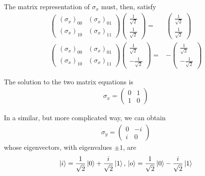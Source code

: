 The matrix representation of $\sigma_x$ must, then, satisfy
\begin{align*}
    \begin{pmatrix}
        (\sigma_x)_{00} & (\sigma_x)_{01}\\ (\sigma_x)_{10} & (\sigma_x)_{11}
    \end{pmatrix}\begin{pmatrix}
        \frac{1}{\sqrt{2}} \\ \frac{1}{\sqrt{2}}
    \end{pmatrix}=&\begin{pmatrix}
        \frac{1}{\sqrt{2}} \\ \frac{1}{\sqrt{2}}
    \end{pmatrix} \\
    \begin{pmatrix}
        (\sigma_x)_{00} & (\sigma_x)_{01}\\ (\sigma_x)_{10} & (\sigma_x)_{11}
    \end{pmatrix}\begin{pmatrix}
        \frac{1}{\sqrt{2}} \\ -\frac{1}{\sqrt{2}}
    \end{pmatrix}=&-\begin{pmatrix}
        \frac{1}{\sqrt{2}} \\ -\frac{1}{\sqrt{2}}
    \end{pmatrix} 
\end{align*}

The solution to the two matrix equations is
\begin{align*}
    \sigma_x=\begin{pmatrix}
        0 & 1\\1 &0
    \end{pmatrix}
\end{align*}

In a similar, but more complicated way, we can obtain
\begin{align*}
    \sigma_y=\begin{pmatrix}
        0 & -i \\ i & 0
    \end{pmatrix}
\end{align*}
whose eigenvectors, with eigenvalues $\pm 1$, are
\begin{align*}
    \ket{i}=\frac{1}{\sqrt{2}}\ket{0}+\frac{i}{\sqrt{2}}\ket{1}, \, \ket{o}=\frac{1}{\sqrt{2}}\ket{0}-\frac{i}{\sqrt{2}}\ket{1}
\end{align*}


